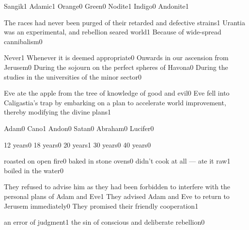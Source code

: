 {Sangik}{1}
{Adamic}{1}
{Orange}{0}
{Green}{0}
{Nodite}{1}
{Indigo}{0}
{Andonite}{1}
\qstop

{The races had never been purged of their retarded and defective strains}{1}
{Urantia was an experimental, and rebellion seared world}{1}
{Because of wide-spread cannibalism}{0}
\qstop

{Never}{1}
{Whenever it is deemed appropriate}{0}
{Onwards in our ascension from Jerusem}{0}
{During the sojourn on the perfect spheres of Havona}{0}
{During the studies in the universities of the minor sector}{0}
\qstop

{Eve ate the apple from the tree of knowledge of good and evil}{0}
{Eve fell into Caligastia's trap by embarking on a plan to accelerate world improvement, thereby modifying the divine plans}{1}
\qstop

{Adam}{0}
{Cano}{1}
{Andon}{0}
{Satan}{0}
{Abraham}{0}
{Lucifer}{0}
\qstop

{12 years}{0}
{18 years}{0}
{20 years}{1}
{30 years}{0}
{40 years}{0}
\qstop

{roasted on open fire}{0}
{baked in stone ovens}{0}
{didn't cook at all --- ate it raw}{1}
{boiled in the water}{0}
\qstop

{They refused to advise him as they had been forbidden to interfere with the personal plans of Adam and Eve}{1}
{They advised Adam and Eve to return to Jerusem immediately}{0}
{They promised their friendly cooperation}{1}
\qstop


{an error of judgment}{1}
{the sin of conscious and deliberate rebellion}{0}
\qstop

